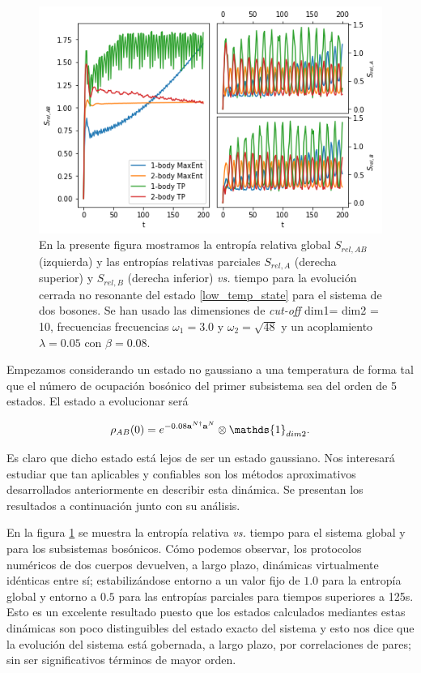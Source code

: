 \documentclass{report} %
\numberwithin{equation}{section}
\begin{document}
\begin{figure}
    \centering
    \includegraphics[scale = 0.7]{figs/section3_4/section5_bxb_low-closed_nonres/bxb_low_closed_nr_rel-entropy.png}
    \caption{En la presente figura mostramos la entropía relativa global $S_{rel,AB}$ (izquierda) y las entropías relativas parciales  $S_{rel,A}$ (derecha superior) y $S_{rel,B}$ (derecha inferior) \textit{vs.} tiempo para la evolución cerrada no resonante del estado \eqref{low_temp_state} para el sistema de dos bosones. Se han usado las dimensiones de \textit{cut-off} dim1= dim2 = 10, frecuencias frecuencias $\omega_1 = 3.0$ y $\omega_2 =\sqrt{48}$ y un acoplamiento $\lambda = 0.05$ con $\beta=0.08$.}
    \label{low_temp_rel-entropy}
\end{figure}

Empezamos considerando un estado no gaussiano a una temperatura de forma tal que el número de ocupación bosónico del primer subsistema sea del orden de 5 estados. El estado a evolucionar será

\begin{equation}
    \rho_{AB}(0) = e^{-0.08{\bf a}^{N\dagger} {\bf a}^{N}} \otimes \mathds{1}_{dim2}. \label{low_temp_state}
\end{equation}

Es claro que dicho estado está lejos de ser un estado gaussiano. Nos interesará estudiar que tan aplicables y confiables son los métodos aproximativos desarrollados anteriormente en describir esta dinámica. Se presentan los resultados a continuación junto con su análisis. 

En la figura \ref{low_temp_rel-entropy} se muestra la entropía relativa \textit{vs.} tiempo para el sistema global y para los subsistemas bosónicos.
Cómo podemos observar, los protocolos numéricos de dos cuerpos devuelven, a largo plazo, dinámicas virtualmente idénticas entre sí; estabilizándose entorno a un valor fijo de $1.0$ para la entropía global y entorno a $0.5$ para las entropías parciales para tiempos superiores a 125s. Esto es un excelente resultado puesto que los estados calculados mediantes estas dinámicas son poco distinguibles del estado exacto del sistema y esto nos dice que la evolución del sistema está gobernada, a largo plazo, por correlaciones de pares; sin ser significativos términos de mayor orden. 
\end{document}
